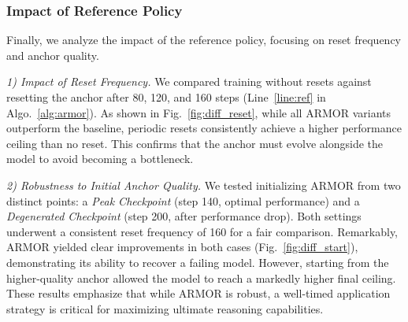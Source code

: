 \subsubsection{Impact of Reference Policy}
Finally, we analyze the impact of the reference policy, focusing on reset frequency and anchor quality.

\textit{1) Impact of Reset Frequency.}
We compared training without resets against resetting the anchor after 80, 120, and 160 steps (Line~\ref{line:ref} in Algo.~\ref{alg:armor}). 
As shown in Fig.~\ref{fig:diff_reset}, while all ARMOR variants outperform the baseline, periodic resets consistently achieve a higher performance ceiling than no reset. 
This confirms that the anchor must evolve alongside the model to avoid becoming a bottleneck.

\textit{2) Robustness to Initial Anchor Quality.}
We tested initializing ARMOR from two distinct points: a \textit{Peak Checkpoint} (step 140, optimal performance) and a \textit{Degenerated Checkpoint} (step 200, after performance drop). Both settings underwent a consistent reset frequency of 160 for a fair comparison.
Remarkably, ARMOR yielded clear improvements in both cases (Fig.~\ref{fig:diff_start}), demonstrating its ability to recover a failing model. However, starting from the higher-quality anchor allowed the model to reach a markedly higher final ceiling.
These results emphasize that while ARMOR is robust, a well-timed application strategy is critical for maximizing ultimate reasoning capabilities.

